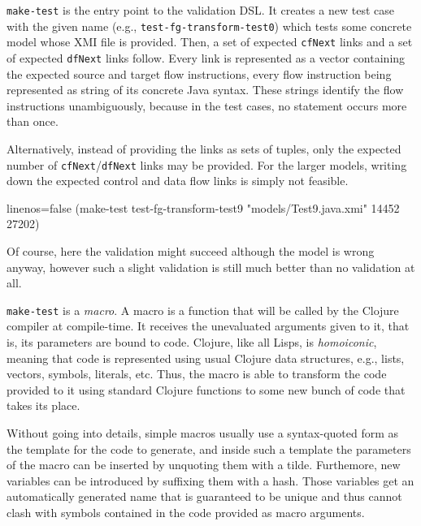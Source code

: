 \documentclass[11pt]{article}
\begin{document}
\verb|make-test| is the entry point to the validation DSL.  It creates a new
test case with the given name (e.g., \verb|test-fg-transform-test0|) which
tests some concrete model whose XMI file is provided.  Then, a set of expected
\verb|cfNext| links and a set of expected \verb|dfNext| links follow.  Every
link is represented as a vector containing the expected source and target flow
instructions, every flow instruction being represented as string of its
concrete Java syntax.  These strings identify the flow instructions
unambiguously, because in the test cases, no statement occurs more than once.

Alternatively, instead of providing the links as sets of tuples, only the
expected number of \verb|cfNext|/\verb|dfNext| links may be provided.  For the
larger models, writing down the expected control and data flow links is simply
not feasible.

\begin{clojurecode*}{linenos=false}
(make-test test-fg-transform-test9 "models/Test9.java.xmi" 14452 27202)
\end{clojurecode*}

Of course, here the validation might succeed although the model is wrong
anyway, however such a slight validation is still much better than no
validation at all.

\verb|make-test| is a \emph{macro}.  A macro is a function that will be called
by the Clojure compiler at compile-time.  It receives the unevaluated arguments
given to it, that is, its parameters are bound to code.  Clojure, like all
Lisps, is \emph{homoiconic}, meaning that code is represented using usual
Clojure data structures, e.g., lists, vectors, symbols, literals, etc.  Thus,
the macro is able to transform the code provided to it using standard Clojure
functions to some new bunch of code that takes its place.

Without going into details, simple macros usually use a syntax-quoted form as
the template for the code to generate, and inside such a template the
parameters of the macro can be inserted by unquoting them with a tilde.
Furthemore, new variables can be introduced by suffixing them with a hash.
Those variables get an automatically generated name that is guaranteed to be
unique and thus cannot clash with symbols contained in the code provided as
macro arguments.
\end{document}
